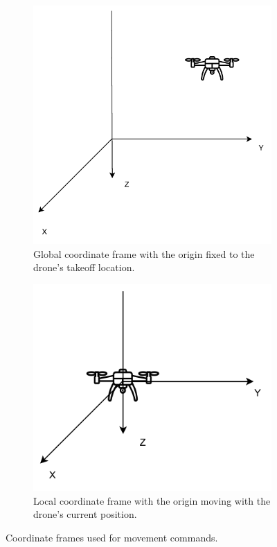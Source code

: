 \begin{figure}[htbp]
    \centering
    \begin{subfigure}{0.45\textwidth}
        \centering
        \includegraphics[width=\linewidth]{coordinate_frame_global.pdf}
        \caption{Global coordinate frame with the origin fixed to the drone's
        takeoff location.}
    \end{subfigure}\hfill
    \begin{subfigure}{0.45\textwidth}
        \centering
        \includegraphics[width=\linewidth]{coordinate_frames_local.pdf}
        \caption{Local coordinate frame with the origin moving with the
        drone's current position.}
    \end{subfigure}
    \caption[Drone movement coordinate systems]{Coordinate frames used for
    movement commands.}
    \label{fig:4_control_coord_frames}
\end{figure}

